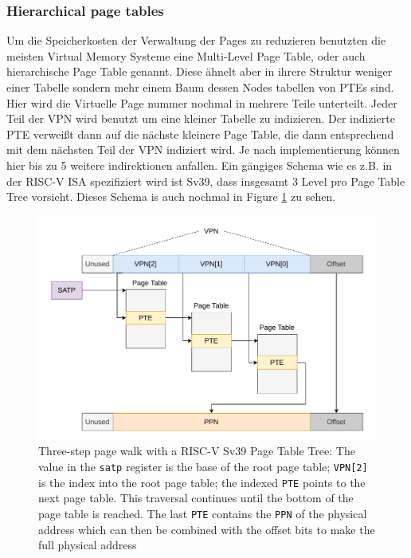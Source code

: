 \subsubsection{Hierarchical page tables}
Um die Speicherkosten der Verwaltung der Pages zu reduzieren benutzten die meisten 
Virtual Memory Systeme eine Multi-Level Page Table, oder auch hierarchische Page Table genannt.
Diese ähnelt aber in ihrere Struktur weniger einer Tabelle sondern mehr einem Baum dessen Nodes tabellen
von PTEs sind.
Hier wird die Virtuelle Page nummer nochmal in mehrere Teile unterteilt. Jeder Teil der VPN
wird benutzt um eine kleiner Tabelle zu indizieren. Der indizierte PTE verweißt dann auf die
nächste kleinere Page Table, die dann entsprechend mit dem nächsten Teil der VPN indiziert wird.
Je nach implementierung können hier bis zu 5 weitere indirektionen anfallen.
Ein gängiges Schema wie es z.B. in der RISC-V ISA spezifiziert wird ist Sv39, dass insgesamt
3 Level pro Page Table Tree vorsieht\cite{riscvreader}. Dieses Schema is auch nochmal
in Figure \ref{fig:fund:pagetree} zu sehen.
\begin{figure}[t]
    \centering
    \includegraphics[scale=.8]{figures/VM-Tree.pdf}
    \caption[RISC-V Sv39 3-Level Page Tree]{Three-step page walk with a RISC-V Sv39 Page Table Tree:
        The value in the \texttt{satp} register is the base of the root page table; \texttt{VPN[2]}
        is the index into the root page table; the indexed \texttt{PTE} points to the next page table.
        This traversal continues until the bottom of the page table is reached. The last \texttt{PTE}
        contains the \texttt{PPN} of the physical address which can then be combined with the offset
        bits to make the full physical address}
    \label{fig:fund:pagetree}
\end{figure}

